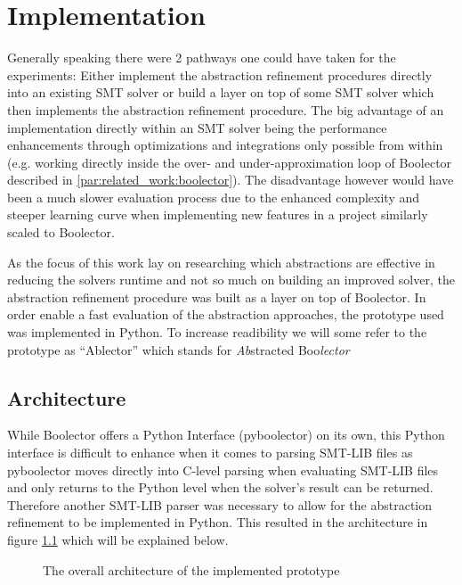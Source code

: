 \chapter{Implementation}
\label{ch:implementation}

Generally speaking there were 2 pathways one could have taken for the experiments:
Either implement the abstraction refinement procedures directly into an existing SMT solver or build a layer on top of some SMT solver which then implements the abstraction refinement procedure.
The big advantage of an implementation directly within an SMT solver being the performance enhancements through optimizations and integrations only possible from within
(e.g. working directly inside the over- and under-approximation loop of Boolector described in \ref{par:related_work:boolector}).
The disadvantage however would have been a much slower evaluation process due to the enhanced complexity and steeper learning curve when implementing new features
in a project similarly scaled to Boolector.
\par
As the focus of this work lay on researching which abstractions are effective in reducing the solvers runtime and not so much on building an improved solver,
the abstraction refinement procedure was built as a layer on top of Boolector.
In order enable a fast evaluation of the abstraction approaches, the prototype used was implemented in Python.
To increase readibility we will some refer to the prototype as \enquote{Ablector} which stands for \textit{Ab}stracted Boo\textit{lector}

\section{Architecture}
While Boolector offers a Python Interface (pyboolector) on its own, this Python interface is difficult to enhance when it comes to parsing SMT-LIB files
as pyboolector moves directly into C-level parsing when evaluating SMT-LIB files and only returns to the Python level when the solver's result can be returned.
Therefore another SMT-LIB parser was necessary to allow for the abstraction refinement to be implemented in Python.
This resulted in the architecture in figure \ref{fig:implementation:architecture} which will be explained below.
\begin{figure}[h!]
    \centering
    \caption{The overall architecture of the implemented prototype}
    \label{fig:implementation:architecture}
\end{figure}


